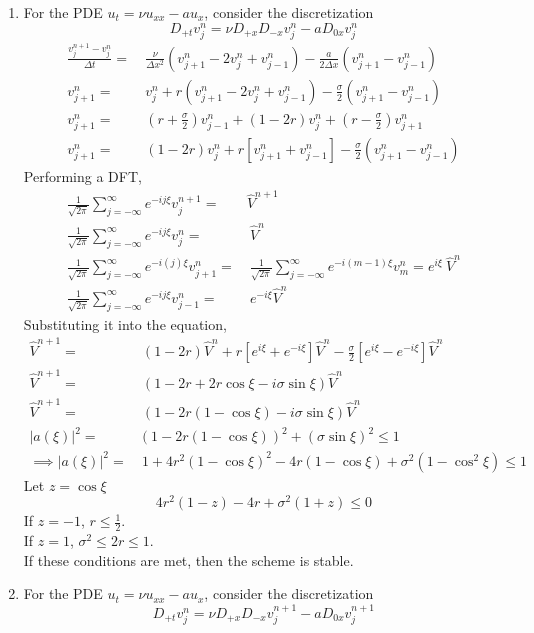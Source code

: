 \documentclass[11pt]{article}
\newcommand{\Dpt}{D_{+t}}
\newcommand{\Dpx}{D_{+x}}
\newcommand{\Dmx}{D_{-x}}
\newcommand{\Dzx}{D_{0x}}
\newcommand{\dx}{\Delta x}
\newcommand{\dt}{\Delta t}
\newcommand{\vnj}{v^{n}_j}
\newcommand{\vnpj}{v^{n+1}_j}
\newcommand{\vnjp}{v^{n}_{j+1}}
\newcommand{\vnjm}{v^{n}_{j-1}}
\newcommand{\ux}{u_x}
\newcommand{\uxx}{u_{xx}}
\newcommand{\ut}{u_t}
\newcommand{\modu}[1]{\left | {#1} \right |}
\begin{document}
\begin{enumerate}
  \begin{enumerate}
  \item {\color{blue}For the PDE} $\ut = \nu\uxx - a\ux${\color{blue}, consider the discretization}
  \[
  \Dpt \vnj = \nu \Dpx\Dmx\vnj -a\Dzx\vnj
  \]
    \begin{align*}
    \frac{\vnpj - \vnj}{\dt} = & \ \frac{\nu}{\dx^2}\left(\vnjp -2\vnj + \vnjm\right) - \frac{a}{2\dx}\left(\vnjp - \vnjm\right) \\
    \vnjp = & \ \vnj + r\left(\vnjp -2\vnj + \vnjm\right) - \frac{\sigma}{2}\left(\vnjp - \vnjm\right)\\
    \vnjp = & \ \left(r+\frac{\sigma}{2}\right)\vnjm + \left(1-2r\right)\vnj + \left(r-\frac{\sigma}{2}\right)\vnjp \\
    \vnjp = & \ \left(1-2r\right)\vnj + r\left[\vnjp + \vnjm\right] - \frac{\sigma}{2}\left(\vnjp - \vnjm\right) 
    \end{align*}
    Performing a DFT, 
    \begin{align*}
    \frac{1}{\sqrt{2\pi}}\sum_{j=-\infty}^{\infty} e^{-ij\xi}\vnpj = & \hat{V}^{n+1}\\
    \frac{1}{\sqrt{2\pi}}\sum_{j=-\infty}^{\infty} e^{-ij\xi}\vnj = & \  \hat{V}^{n} \\ 
    \frac{1}{\sqrt{2\pi}}\sum_{j=-\infty}^{\infty} e^{-i(j)\xi}\vnjp = & \ \frac{1}{\sqrt{2\pi}}\sum_{j=-\infty}^{\infty} e^{-i(m-1)\xi}v^n_m = e^{i\xi} \ \hat{V}^n \\
    \frac{1}{\sqrt{2\pi}}\sum_{j=-\infty}^{\infty} e^{-ij\xi}\vnjm =& \  e^{-i\xi}\hat{V}^n
    \end{align*}
    Substituting it into the equation,
    \begin{align*}
    \hat{V}^{n+1} = & \ \left(1-2r\right)\hat{V}^n + r\left[e^{i\xi} + e^{-i\xi}\right]\hat{V}^n - \frac{\sigma}{2}\left[e^{i\xi} - e^{-i\xi}\right]\hat{V}^n \\
    \hat{V}^{n+1} = & \ \left(1 - 2r + 2r\cos\xi - i\sigma\sin\xi\right)\hat{V}^n \\
    \hat{V}^{n+1} = & \ \left(1-2r\left(1-\cos\xi\right) - i\sigma\sin\xi\right)\hat{V}^n \\
    \modu{a(\xi)}^2 = & \left(1-2r\left(1-\cos\xi\right)\right)^2 + \left(\sigma\sin\xi\right)^2 \leq 1 \\
    \implies \modu{a(\xi)}^2 = &\ 1 + 4r^2\left(1-\cos\xi\right)^2 -4r\left(1-\cos\xi\right) + \sigma^2\left(1-\cos^2\xi\right) \leq 1 
    \end{align*}
    Let $z = \cos\xi$ 
\[
4r^2\left(1-z\right) -4r + \sigma^2\left(1+z\right) \leq 0
\]
If $z=-1$, $r\leq \frac{1}{2}$. \\
If $z = 1$, $\sigma^2 \leq 2r \leq 1$.\\
If these conditions are met, then the scheme is stable. 
  \item {\color{blue}For the PDE} $\ut = \nu\uxx - a\ux${\color{blue}, consider the discretization}
  \[
  \Dpt \vnj = \nu \Dpx\Dmx\vnpj -a\Dzx\vnpj
  \]
    

\end{enumerate}
\end{enumerate}
\end{document}
